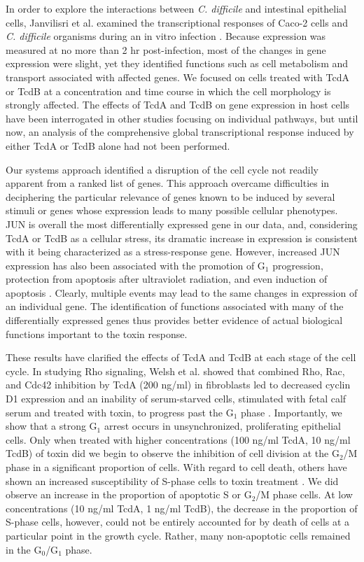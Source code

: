 In order to explore the interactions between \textit{C. difficile} 
and intestinal epithelial cells, Janvilisri et al. examined 
the transcriptional responses of Caco-2 cells and 
\textit{C. difficile} organisms during an in vitro 
infection \cite{Janvilisri:2010wf}. Because expression 
was measured at no more than 2 hr post-infection, most 
of the changes in gene expression were slight, yet they 
identified functions such as cell metabolism and 
transport associated with affected genes. We focused on 
cells treated with TcdA or TcdB at a concentration and 
time course in which the cell morphology is strongly 
affected. The effects of TcdA and TcdB on gene expression 
in host cells have been interrogated in other studies 
focusing on individual pathways, but until now, an analysis 
of the comprehensive global transcriptional response 
induced by either TcdA or TcdB alone had not been performed.

Our systems approach identified a disruption of the cell 
cycle not readily apparent from a ranked list of genes. This 
approach overcame difficulties in deciphering the particular 
relevance of genes known to be induced by several stimuli 
or genes whose expression leads to many possible cellular 
phenotypes. JUN is overall the most differentially 
expressed gene in our data, and, considering TcdA or 
TcdB as a cellular stress, its dramatic increase in 
expression is consistent with it being characterized 
as a stress-response gene. However, increased JUN 
expression has also been associated with the promotion 
of G$_{\text{1}}$ progression, protection from apoptosis 
after ultraviolet radiation, and even induction of 
apoptosis \cite{Ameyar:2003cc}. Clearly, multiple 
events may lead to the same changes in expression of 
an individual gene. The identification of functions 
associated with many of the differentially expressed 
genes thus provides better evidence of actual 
biological functions important to the toxin response. 

These results have clarified the effects of TcdA and TcdB at 
each stage of the cell cycle. In studying Rho signaling, 
Welsh et al. showed that combined Rho, Rac, and Cdc42 
inhibition by TcdA (200 ng/ml) in fibroblasts led to 
decreased cyclin D1 expression and an inability of 
serum-starved cells, stimulated with fetal calf serum 
and treated with toxin, to progress past the 
G$_{\text{1}}$ phase \cite{Welsh:2001id}. Importantly, 
we show that a strong G$_{\text{1}}$ arrest occurs in 
unsynchronized, proliferating epithelial cells. Only when 
treated with higher concentrations (100 ng/ml TcdA, 
10 ng/ml TcdB) of toxin did we begin to observe the inhibition 
of cell division at the G$_{\text{2}}$/M phase in a 
significant proportion of cells. With regard to cell death, 
others have shown an increased susceptibility of S-phase cells 
to toxin treatment \cite{Huelsenbeck:2007df}. We did 
observe an increase in the proportion of apoptotic S 
or G$_{\text{2}}$/M phase cells. At low concentrations 
(10 ng/ml TcdA, 1 ng/ml TcdB), the decrease in the 
proportion of S-phase cells, however, could not be 
entirely accounted for by death of cells at a 
particular point in the growth cycle. Rather, many 
non-apoptotic cells remained in the 
G$_{\text{0}}$/G$_{\text{1}}$ phase.

